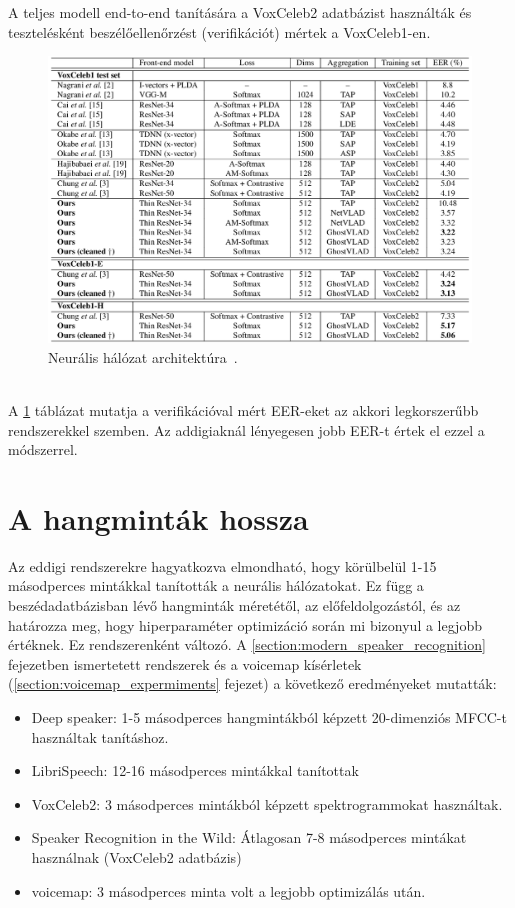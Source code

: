 A teljes modell end-to-end tanítására a VoxCeleb2 adatbázist használták és tesztelésként beszélőellenőrzést (verifikációt) mértek a VoxCeleb1-en.
\begin{figure}[!ht]
	\centering
	\includegraphics[width=150mm, keepaspectratio]{figures/frame-cnn-results.png}
	\caption{Neurális hálózat architektúra~\cite{speaker_in_the_wild}.}
	\label{fig:frame-cnn-results}
\end{figure}
\ \\
A \ref{fig:frame-cnn-results} táblázat mutatja a verifikációval mért EER-eket az akkori legkorszerűbb rendszerekkel szemben. Az addigiaknál lényegesen jobb EER-t értek el ezzel a módszerrel.

\section{A hangminták hossza}

Az eddigi rendszerekre hagyatkozva elmondható, hogy körülbelül 1-15 másodperces mintákkal tanították a neurális hálózatokat. Ez függ a beszédadatbázisban lévő hangminták méretétől, az előfeldolgozástól, és az határozza meg, hogy hiperparaméter optimizáció során mi bizonyul a legjobb értéknek. Ez rendszerenként változó. A \ref{section:modern_speaker_recognition} fejezetben ismertetett rendszerek és a voicemap kísérletek (\ref{section:voicemap_expermiments} fejezet) a következő eredményeket mutatták:

\begin{itemize}
	\item Deep speaker: 1-5 másodperces hangmintákból képzett 20-dimenziós MFCC-t használtak tanításhoz.
	\item LibriSpeech: 12-16 másodperces mintákkal tanítottak
	\item VoxCeleb2: 3 másodperces mintákból képzett spektrogrammokat használtak.
	\item Speaker Recognition in the Wild: Átlagosan 7-8 másodperces mintákat használnak (VoxCeleb2 adatbázis)
	\item voicemap: 3 másodperces minta volt a legjobb optimizálás után.
\end{itemize}

